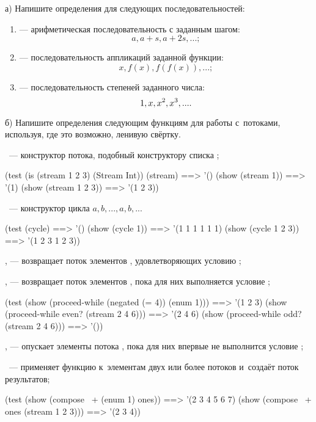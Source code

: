 \begin{Assignment}
а) Напишите определения для следующих последовательностей:
\begin{enumerate}
\item {} --- арифметическая последовательность с заданным шагом: $$a, a+s, a+2s, ...;$$
\item \label{iteration} --- последовательность аппликаций заданной функции: $$x, f(x), f(f(x)), ...;$$
\item {} --- последовательность степеней заданного числа: $$1, x, x^2 , x^3, ... .$$
\end{enumerate}


б) Напишите определения следующим функциям для работы с~потоками, используя, где это возможно, ленивую свёртку.

~--- конструктор потока, подобный конструктору списка ;
\begin{Specification}
(test 
  (is (stream 1 2 3) (Stream Int))
  (stream)              ==> '()
  (show (stream 1))     ==> '(1)
  (show (stream 1 2 3)) ==> '(1 2 3))
\end{Specification}

~--- конструктор цикла $a,b,...,a, b,...$
\begin{Specification}
(test 
  (cycle)              ==> '()
  (show (cycle 1))     ==> '(1 1 1 1 1 1)
  (show (cycle 1 2 3)) ==> '(1 2 3 1 2 3))
\end{Specification}


\label{lazy-filter}, --- возвращает поток элементов , удовлетворяющих условию ;

\label{until}, --- возвращает поток элементов , пока для них выполняется условие ;

\begin{Specification}
(test
  (show (proceed-while (negated (= 4)) (enum 1))) ==> '(1 2 3)
  (show (proceed-while even? (stream 2 4 6)))     ==> '(2 4 6)
  (show (proceed-while odd? (stream 2 4 6)))      ==> '())
\end{Specification}

\label{until}, --- опускает элементы потока , пока для них впервые не выполнится условие ;

~--- применяет функцию  к~элементам двух или более потоков и~создаёт поток результатов;

\begin{Specification}
(test
  (show (compose~ + (enum 1) ones))       ==> '(2 3 4 5 6 7)
  (show (compose~ + ones (stream 1 2 3))) ==> '(2 3 4))
\end{Specification}
\end{Assignment}

